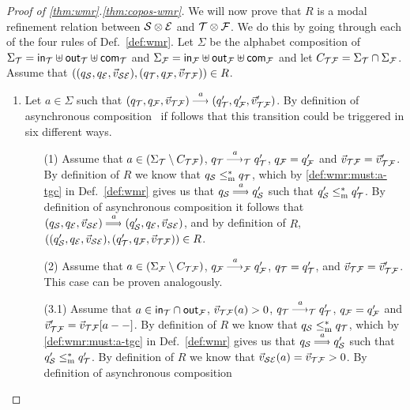 \begin{proof}[Proof of \ref{thm:wmr}.\ref{thm:copos-wmr}]
    We will now prove that $R$ is a modal refinement relation between $\mathcal{S} \otimes \mathcal{E} $ and $ \mathcal{T} \otimes \mathcal{F}$. We do this by going through each of the four rules of Def.~\ref{def:wmr}.
    Let $\Sigma$ be the alphabet composition of $\Sigma_{\mathcal{T}} = \mathsf{in}_{\mathcal{T}} \uplus \mathsf{out}_{\mathcal{T}} \uplus \mathsf{com}_{\mathcal{T}}$ and $\Sigma_{\mathcal{F}} = \mathsf{in}_{\mathcal{F}} \uplus \mathsf{out}_{\mathcal{F}} \uplus \mathsf{com}_{\mathcal{F}}$ and let $C_{\mathcal{T}\mathcal{F}} = \Sigma_{\mathcal{T}} \cap \Sigma_{\mathcal{F}}$. Assume that $((q_{\mathcal{S}},q_{\mathcal{E}}, \vec{v}_{\mathcal{S}\mathcal{E}}),(q_{\mathcal{T}},q_{\mathcal{F}}, \vec{v}_{\mathcal{T}\mathcal{F}})) \in R$.
    \begin{enumerate}
        \item Let $a \in \Sigma$ such that $(q_\T,q_\F,\vec{v}_{\T\F}) \must{a} (q_\T',q_\F',\vec{v}'_{\T\F})$. 
        By definition of asynchronous composition~\cite{haddad-et-al-2013} if follows that
        this transition could be triggered in six different ways.
        \begin{enumerate}
            \item[(1)] Assume that $a \in (\Sigma_{\mathcal{T}} \setminus C_{\mathcal{T}\mathcal{F}})$, $q_\T \must{a}_\T q'_\T$, $q_{\mathcal{F}} = q'_{\mathcal{F}}$ and $\vec{v}_{\mathcal{T}\mathcal{F}} = \vec{v}'_{\mathcal{T}\mathcal{F}}$. By definition of $R$ we know that $q_{\mathcal{S}} \le^*_\mathrm m q_{\mathcal{T}}$, which by \ref{def:wmr:must:a-tgc} in Def.~\ref{def:wmr} gives us that $q_\S \mustw{a} q'_\S$ such that $q'_{\mathcal{S}} \le^*_\mathrm m q'_{\mathcal{T}}$. 
            By definition of asynchronous composition
            it follows that $(q_\S,q_\E, \vec{v}_{\S\E}) \mustw{a} (q_\S',q_\E, \vec{v}_{\S\E})$, and by definition of $R$, $((q_{\mathcal{S}}',q_{\mathcal{E}}, \vec{v}_{\mathcal{S}\mathcal{E}}),(q_{\mathcal{T}}',q_{\mathcal{F}},\vec{v}_{\mathcal{T}\mathcal{F}})) \in R$.
            \vspace{1mm}
            \item[(2)] Assume that $a \in (\Sigma_{\mathcal{F}} \setminus C_{\mathcal{T}\mathcal{F}})$, $q_\F \must{a}_\F q'_\F$, $q_{\mathcal{T}} = q'_{\mathcal{T}}$,  and $\vec{v}_{\mathcal{T}\mathcal{F}} = \vec{v}'_{\mathcal{T}\mathcal{F}}$. This case can be proven analogously.
            \vspace{1mm}
            \item[(3.1)] Assume that $a \in \mathsf{in}_{\mathcal{T}} \cap \mathsf{out}_{\mathcal{F}}$, $\vec{v}_{\mathcal{T}\mathcal{F}}(a) > 0$,  $q_\T \must{a}_\T q'_\T$, $q_{\mathcal{F}} = q'_{\mathcal{F}}$ and $\vec{v}'_{\mathcal{T}\mathcal{F}} = \vec{v}_{\mathcal{T}\mathcal{F}}[a--]$. By definition of $R$ we know that $q_{\mathcal{S}} \le^*_\mathrm m q_{\mathcal{T}}$, which by \ref{def:wmr:must:a-tgc} in Def.~\ref{def:wmr} gives us that $q_\S \mustw{a} q'_\S$ such that $q'_{\mathcal{S}} \le^*_\mathrm m q'_{\mathcal{T}}$. By definition of $R$ we know that $\vec{v}_{\mathcal{S}\mathcal{E}}(a) = \vec{v}_{\mathcal{T}\mathcal{F}} > 0$. 
            By definition of asynchronous composition

\end{enumerate}
\end{enumerate}
\end{proof}
